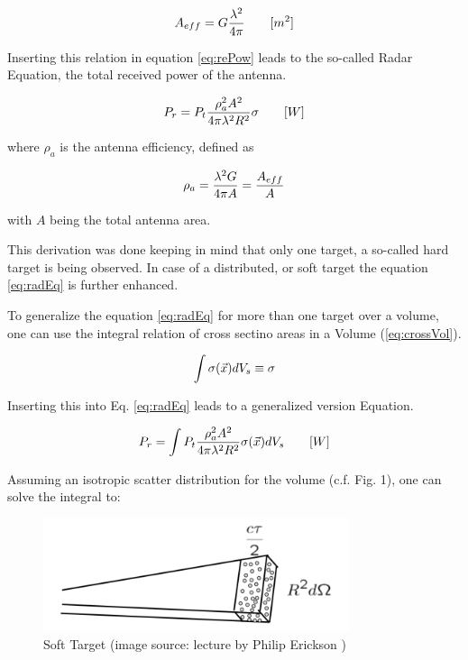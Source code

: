 \begin{equation}
\label{eq:Aeff}
	\centering
	A_{eff} = G \frac{\lambda^2}{4\pi} \qquad [m^2]
\end{equation}

Inserting this relation in equation \ref{eq:rePow} leads to the so-called Radar Equation, the total received power of the antenna.

\begin{equation}
\label{eq:radEq}
	\centering
	P_{r} = P_t \frac{\rho_a^2 A^2 }{4 \pi \lambda^2 R^2} \sigma \qquad [W]
\end{equation}

where $\rho_{a} $ is the antenna efficiency, defined as

\begin{equation}
\label{eq:effi}
	\centering
	\rho_a = \frac{\lambda^2 G }{4 \pi A} = \frac{A_{eff}}{A}
\end{equation}

with $A$ being the total antenna area.

This derivation was done keeping in mind that only one target, a so-called hard target is being observed. In case of a distributed, or soft target the equation \ref{eq:radEq} is further enhanced.

To generalize the equation \ref{eq:radEq} for more than one target over a volume, one can use the integral relation of cross sectino areas in a Volume (\ref{eq:crossVol}).

\begin{equation}
	\label{eq:crossVol}
	\centering
	\int \sigma(\vec{x}) dV_s \equiv \sigma
\end{equation}

Inserting this into Eq. \ref{eq:radEq} leads to a generalized version Equation.

\begin{equation}
\label{eq:radEqGen}
	\centering
	P_{r} = \int P_t \frac{\rho_a^2 A^2 }{4 \pi \lambda^2 R^2} \sigma(\vec{x}) dV_s \qquad [W]
\end{equation}




Assuming an isotropic scatter distribution for the volume (c.f. Fig. 1), one can solve the integral to:

\begin{figure}
	\centering
	\label{fig:softTarget}
	\includegraphics[width=0.8\textwidth]{images/softTarget}
	\caption{Soft Target (image source: lecture by Philip Erickson \citep{erickson:lecture})}
\end{figure}

